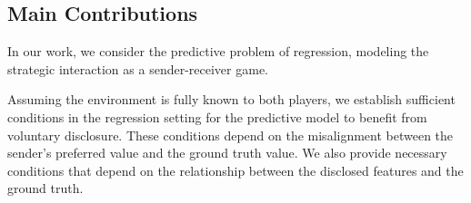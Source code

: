 \subsection{Main Contributions}

In our work, we consider the predictive problem of regression, modeling the strategic interaction as a sender-receiver game. 

Assuming the environment is fully known to both players, we establish sufficient conditions in the regression setting for the predictive model to benefit from voluntary disclosure. These conditions depend on the misalignment between the sender's preferred value and the ground truth value. We also provide necessary conditions that depend on the relationship between the disclosed features and the ground truth.
